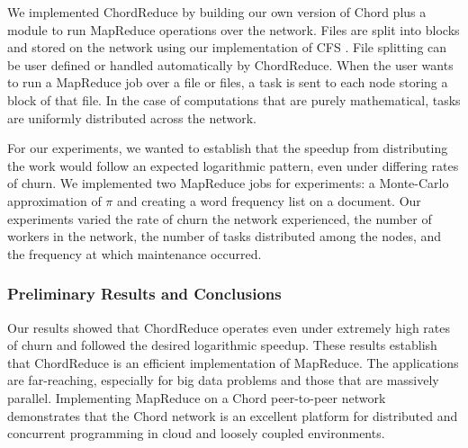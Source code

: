 \documentclass{article}
\begin{document}
We implemented ChordReduce by building our own version of Chord plus a module to run MapReduce operations over the network. Files are split into blocks and stored on the network using our implementation of CFS \cite{CFS}.  File splitting can be user defined or handled automatically by ChordReduce.  When the user wants to run a MapReduce job over a file or files, a task is sent to each node storing a block of that file.  In the case of computations that are purely mathematical, tasks are uniformly distributed across the network.


For our experiments, we wanted to establish that the speedup from distributing the work would follow an expected logarithmic pattern, even under differing rates of churn.  We implemented two MapReduce jobs for experiments: a Monte-Carlo approximation of $\pi$ and creating a word frequency list on a document.  Our experiments varied the rate of churn the network experienced, the number of workers in the network, the number of tasks distributed among the nodes, and the frequency at which maintenance occurred.






\subsubsection*{Preliminary Results and Conclusions}
Our results showed that ChordReduce operates even under extremely high rates of churn and followed the desired logarithmic speedup.  These results establish that ChordReduce is an efficient implementation of MapReduce. 
The applications are far-reaching, especially for big data problems and those that are massively parallel. 
Implementing MapReduce on a Chord peer-to-peer network demonstrates that the Chord network is an excellent platform for distributed and concurrent programming in cloud and loosely coupled environments.



\end{document}
